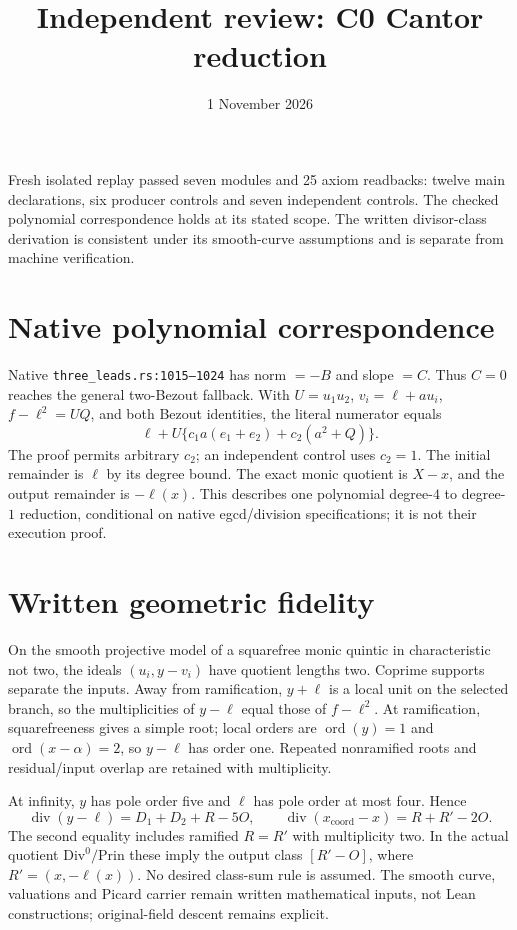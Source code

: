 \documentclass[10pt]{article}\usepackage[margin=0.8in]{geometry}\usepackage[T1]{fontenc}\usepackage{lmodern,amsmath,hyperref}
\title{Independent review: C0 Cantor reduction}\date{1 November 2026}
\begin{document}
\maketitle
Fresh isolated replay passed seven modules and 25 axiom readbacks: twelve main declarations, six producer controls and seven independent controls. The checked polynomial correspondence holds at its stated scope. The written divisor-class derivation is consistent under its smooth-curve assumptions and is separate from machine verification.
\section*{Native polynomial correspondence}
Native \texttt{three\_leads.rs:1015--1024} has norm $=-B$ and slope $=C$. Thus $C=0$ reaches the general two-Bezout fallback. With $U=u_1u_2$, $v_i=\ell+au_i$, $f-\ell^2=UQ$, and both Bezout identities, the literal numerator equals
\[\ell+U\{c_1a(e_1+e_2)+c_2(a^2+Q)\}.\]
The proof permits arbitrary $c_2$; an independent control uses $c_2=1$. The initial remainder is $\ell$ by its degree bound. The exact monic quotient is $X-x$, and the output remainder is $-\ell(x)$. This describes one polynomial degree-$4$ to degree-$1$ reduction, conditional on native egcd/division specifications; it is not their execution proof.
\section*{Written geometric fidelity}
On the smooth projective model of a squarefree monic quintic in characteristic not two, the ideals $(u_i,y-v_i)$ have quotient lengths two. Coprime supports separate the inputs. Away from ramification, $y+\ell$ is a local unit on the selected branch, so the multiplicities of $y-\ell$ equal those of $f-\ell^2$. At ramification, squarefreeness gives a simple root; local orders are $\operatorname{ord}(y)=1$ and $\operatorname{ord}(x-\alpha)=2$, so $y-\ell$ has order one. Repeated nonramified roots and residual/input overlap are retained with multiplicity.

At infinity, $y$ has pole order five and $\ell$ has pole order at most four. Hence
\[\operatorname{div}(y-\ell)=D_1+D_2+R-5O,\qquad
\operatorname{div}(x_{\mathrm{coord}}-x)=R+R'-2O.\]
The second equality includes ramified $R=R'$ with multiplicity two. In the actual quotient $\mathrm{Div}^0/\mathrm{Prin}$ these imply the output class $[R'-O]$, where $R'=(x,-\ell(x))$. No desired class-sum rule is assumed. The smooth curve, valuations and Picard carrier remain written mathematical inputs, not Lean constructions; original-field descent remains explicit.
\end{document}
